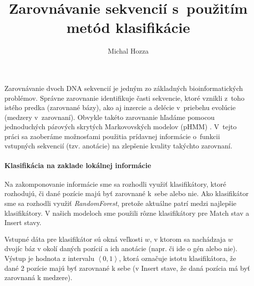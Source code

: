 \documentclass{svk_short_sk}
\begin{document}
\title{Zarovnávanie sekvencií s~použitím metód klasifikácie}

\author{Michal Hozza
}




\maketitle

Zarovnávanie dvoch DNA sekvencií je jedným zo základných
bioinformatických problémov. Správne zarovnanie identifikuje časti
sekvencie, ktoré vznikli z~toho istého predka (zarovnané bázy), ako aj
inzercie a delécie v~priebehu evolúcie (medzery v~zarovnaní). Obvykle
takéto zarovnanie hľadáme pomocou jednoduchých párových skrytých
Markovovských modelov (pHMM) \cite{durbin}. V~tejto práci sa zaoberáme
možnosťami použitia prídavnej informácie o~funkcii vstupných sekvencií
(tzv. anotácie) na zlepšenie kvality takýchto zarovnaní.

\paragraph{Klasifikácia na zaklade lokálnej informácie}

Na zakomponovanie informácie sme sa rozhodli využiť klasifikátory, ktoré rozhodujú, či dané pozície majú byť zarovnané k~sebe alebo nie. Ako klasifikátor sme sa rozhodli využiť \emph{RandomForest}\cite{randomForestPaper}, pretože aktuálne patrí medzi najlepšie klasifikátory.
V našich modeloch sme použili rôzne klasifikátory pre Match stav a Insert stavy.

Vstupné dáta pre klasifikátor sú okná veľkosti $w$, v ktorom sa nachádzaja $w$ dvojíc báz v okolí daných pozícií a ich anotácie (napr. či ide o gén alebo nie). Výstup je hodnota z intervalu $\left<0,1\right>$, ktorá označuje istotu klasifikátora, že dané 2 pozície majú byť zarovnané k sebe (v Insert stave, že daná pozícia má byť zarovnaná k medzere).
\end{document}
